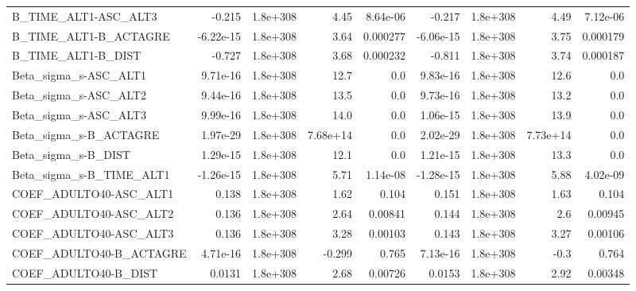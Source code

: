 \begin{tabular}{lrrrrrrrr}
B\_TIME\_ALT1-ASC\_ALT3              &      -0.215 &     1.8e+308 &      4.45 & 8.64e-06 &     -0.217 &    1.8e+308 &         4.49 &      7.12e-06 \\
B\_TIME\_ALT1-B\_ACTAGRE             &   -6.22e-15 &     1.8e+308 &      3.64 & 0.000277 &  -6.06e-15 &    1.8e+308 &         3.75 &      0.000179 \\
B\_TIME\_ALT1-B\_DIST                &      -0.727 &     1.8e+308 &      3.68 & 0.000232 &     -0.811 &    1.8e+308 &         3.74 &      0.000187 \\
Beta\_sigma\_s-ASC\_ALT1             &    9.71e-16 &     1.8e+308 &      12.7 &      0.0 &   9.83e-16 &    1.8e+308 &         12.6 &           0.0 \\
Beta\_sigma\_s-ASC\_ALT2             &    9.44e-16 &     1.8e+308 &      13.5 &      0.0 &   9.73e-16 &    1.8e+308 &         13.2 &           0.0 \\
Beta\_sigma\_s-ASC\_ALT3             &    9.99e-16 &     1.8e+308 &      14.0 &      0.0 &   1.06e-15 &    1.8e+308 &         13.9 &           0.0 \\
Beta\_sigma\_s-B\_ACTAGRE            &    1.97e-29 &     1.8e+308 &  7.68e+14 &      0.0 &   2.02e-29 &    1.8e+308 &     7.73e+14 &           0.0 \\
Beta\_sigma\_s-B\_DIST               &    1.29e-15 &     1.8e+308 &      12.1 &      0.0 &   1.21e-15 &    1.8e+308 &         13.3 &           0.0 \\
Beta\_sigma\_s-B\_TIME\_ALT1          &   -1.26e-15 &     1.8e+308 &      5.71 & 1.14e-08 &  -1.28e-15 &    1.8e+308 &         5.88 &      4.02e-09 \\
COEF\_ADULTO40-ASC\_ALT1            &       0.138 &     1.8e+308 &      1.62 &    0.104 &      0.151 &    1.8e+308 &         1.63 &         0.104 \\
COEF\_ADULTO40-ASC\_ALT2            &       0.136 &     1.8e+308 &      2.64 &  0.00841 &      0.144 &    1.8e+308 &          2.6 &       0.00945 \\
COEF\_ADULTO40-ASC\_ALT3            &       0.136 &     1.8e+308 &      3.28 &  0.00103 &      0.143 &    1.8e+308 &         3.27 &       0.00106 \\
COEF\_ADULTO40-B\_ACTAGRE           &    4.71e-16 &     1.8e+308 &    -0.299 &    0.765 &   7.13e-16 &    1.8e+308 &         -0.3 &         0.764 \\
COEF\_ADULTO40-B\_DIST              &      0.0131 &     1.8e+308 &      2.68 &  0.00726 &     0.0153 &    1.8e+308 &         2.92 &       0.00348 \\

\end{tabular}
